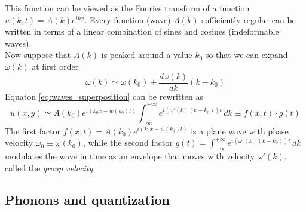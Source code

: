 This function can be viewed as the Fouries transform of a function $u(k,t) = A(k)e^{ikx}$.
Every function (wave) $A(k)$ sufficiently regular can be written in terms of a linear combination of sines and cosines (indeformable waves). \\
Now suppose that $A(k)$ is peaked around a value $k_0$ so that we can expand $\omega(k)$ at first order 
$$\omega(k) \simeq \omega(k_0) + \frac{d\omega(k)}{dk}(k-k_0)$$ Equaton \ref{eq:waves_superposition} can be rewritten as 
\begin{equation*}
    u(x,y) \simeq A(k_0)e^{i(k_0x - w(k_0) t)} \int_{-\infty}^{+\infty} e^{i(\omega'(k)(k-k_0))t} \, dk 
    \equiv f(x,t) \cdot g(t)
\end{equation*}
The first factor $f(x,t) = A(k_0)e^{i(k_0x - w(k_0) t)}$ is a plane wave with phase velocity $\omega_0 \equiv \omega(k_0)$, while the second factor
$g(t) = \int_{-\infty}^{+\infty} e^{i(\omega'(k)(k-k_0))t} \, dk$ modulates the wave in time as an envelope that moves with velocity $\omega'(k)$, called the \emph{group velocity}.

\subsection*{Phonons and quantization}
